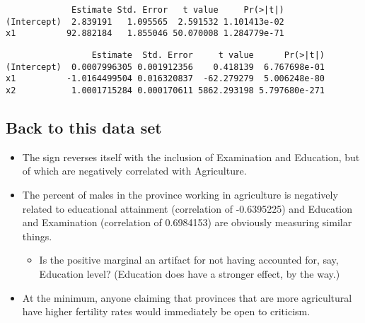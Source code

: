\documentclass[12pt,]{04-class-files/abntex2}
\newenvironment{Shaded}{\begin{snugshade}}{\end{snugshade}}
\newcommand{\KeywordTok}[1]{\textcolor[rgb]{0.13,0.29,0.53}{\textbf{#1}}}
\newcommand{\NormalTok}[1]{#1}
\newcommand{\OperatorTok}[1]{\textcolor[rgb]{0.81,0.36,0.00}{\textbf{#1}}}
\newcommand{\StringTok}[1]{\textcolor[rgb]{0.31,0.60,0.02}{#1}}
\providecommand{\tightlist}{%
  \setlength{\itemsep}{0pt}\setlength{\parskip}{0pt}}
\begin{document}
\begin{verbatim}
             Estimate Std. Error   t value     Pr(>|t|)
(Intercept)  2.839191   1.095565  2.591532 1.101413e-02
x1          92.882184   1.855046 50.070008 1.284779e-71
\end{verbatim}

\begin{Shaded}
\end{Shaded}

\begin{verbatim}
                 Estimate  Std. Error     t value      Pr(>|t|)
(Intercept)  0.0007996305 0.001912356    0.418139  6.767698e-01
x1          -1.0164499504 0.016320837  -62.279279  5.006248e-80
x2           1.0001715284 0.000170611 5862.293198 5.797680e-271
\end{verbatim}

\hypertarget{back-to-this-data-set}{%
\subsection{Back to this data set}\label{back-to-this-data-set}}

\begin{itemize}
\tightlist
\item
  The sign reverses itself with the inclusion of Examination and Education, but of which are negatively correlated with Agriculture.
\item
  The percent of males in the province working in agriculture is negatively related to educational attainment (correlation of -0.6395225) and Education and Examination (correlation of 0.6984153) are obviously measuring similar things.

  \begin{itemize}
  \tightlist
  \item
    Is the positive marginal an artifact for not having accounted for, say, Education level? (Education does have a stronger effect, by the way.)
  \end{itemize}
\item
  At the minimum, anyone claiming that provinces that are more agricultural have higher fertility rates would immediately be open to criticism.
\end{itemize}
\end{document}
